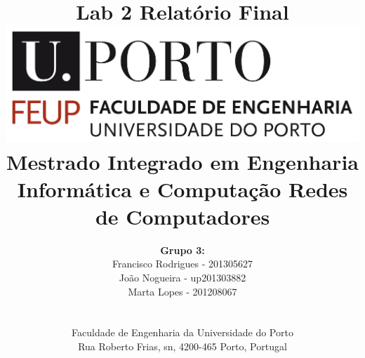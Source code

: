 \documentclass[a4paper]{article}
\begin{document}
	

	\setlength{\textwidth}{16cm}
	\setlength{\textheight}{22cm}
	
	\title{\Huge\textbf{Lab 2}\linebreak\linebreak\linebreak
	\Large\textbf{Relatório Final}\linebreak\linebreak
	\linebreak\linebreak
	\includegraphics[scale=0.1]{./res/feup-logo.png}\linebreak\linebreak
	\linebreak\linebreak
	\Large{Mestrado Integrado em Engenharia Informática e Computação} \linebreak\linebreak
	\Large{Redes de Computadores}\linebreak
		}
	

	\author{
	\textbf{Grupo 3:}\\
	Francisco Rodrigues - 201305627 \\
	João Nogueira - up201303882 \\
	Marta Lopes - 201208067 \\
	\linebreak\linebreak \\
	 \\ Faculdade de Engenharia da Universidade do Porto \\ Rua Roberto Frias, s\/n, 4200-465 Porto, Portugal \linebreak\linebreak\linebreak
	\linebreak\linebreak\vspace{1cm}}
	
\end{document}
